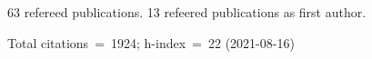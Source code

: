 63 refereed publications. 13 refeered publications as first author.

Total citations~=~1924; h-index~=~22 (2021-08-16)